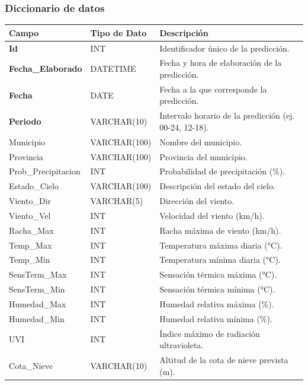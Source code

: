 \documentclass[12pt, a4paper]{article}
\begin{document}
\subsubsection*{Diccionario de datos}
\begin{center}
\begin{tabular}{|p{}|p{}|p{}|}
\hline
\textbf{Campo} & \textbf{Tipo de Dato} & \textbf{Descripción} \\
\hline
\textbf{Id} & INT & Identificador único de la predicción. \\
\textbf{Fecha\_Elaborado} & DATETIME & Fecha y hora de elaboración de la predicción. \\
\textbf{Fecha} & DATE & Fecha a la que corresponde la predicción. \\
\textbf{Periodo} & VARCHAR(10) & Intervalo horario de la predicción (ej. 00-24, 12-18). \\
Municipio & VARCHAR(100) & Nombre del municipio. \\
Provincia & VARCHAR(100) & Provincia del municipio. \\
Prob\_Precipitacion & INT & Probabilidad de precipitación (\%). \\
Estado\_Cielo & VARCHAR(100) & Descripción del estado del cielo. \\
Viento\_Dir & VARCHAR(5) & Dirección del viento. \\
Viento\_Vel & INT & Velocidad del viento (km/h). \\
Racha\_Max & INT & Racha máxima de viento (km/h). \\
Temp\_Max & INT & Temperatura máxima diaria (°C). \\
Temp\_Min & INT & Temperatura mínima diaria (°C). \\
SensTerm\_Max & INT & Sensación térmica máxima (°C). \\
SensTerm\_Min & INT & Sensación térmica mínima (°C). \\
Humedad\_Max & INT & Humedad relativa máxima (\%). \\
Humedad\_Min & INT & Humedad relativa mínima (\%). \\
UVI & INT & Índice máximo de radiación ultravioleta. \\
Cota\_Nieve & VARCHAR(10) & Altitud de la cota de nieve prevista (m). \\
\hline
\end{tabular}
\end{center}
\end{document}
